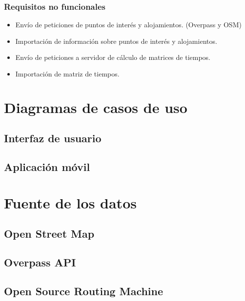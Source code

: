 \subsubsection[Requisitos no funcionales]{Requisitos no funcionales}
\begin{itemize}
	\item Envío de peticiones de puntos de interés y alojamientos. (Overpass y OSM)
	\item Importación de información sobre puntos de interés y alojamientos.
	\item Envío de peticiones a servidor de cálculo de matrices de tiempos.
	\item Importación de matriz de tiempos.
\end{itemize}

\section[Casos de uso]{Diagramas de casos de uso}
\subsection[Interfaz de usuario]{Interfaz de usuario}
\subsection[Aplicación]{Aplicación móvil}



\section[Fuente de los datos]{Fuente de los datos}
\subsection[OSM]{Open Street Map}
\subsection[Overpass]{Overpass API}
\subsection[OSRM]{Open Source Routing Machine}

